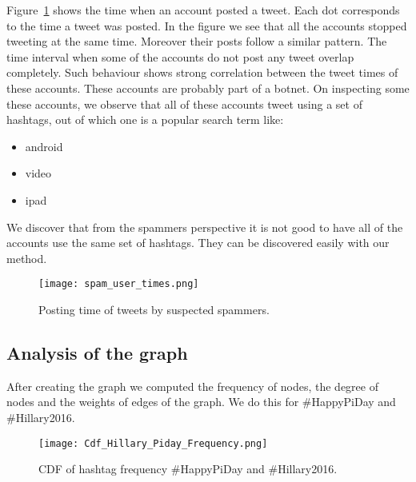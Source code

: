\documentclass[journal, a4paper, 12pt]{article}
\begin{document}
Figure~\ref{fig:spam_user_times} shows the time when an account posted a tweet. Each dot corresponds to the time a tweet was posted. In the figure we see that all the accounts stopped tweeting at the same time. Moreover their posts follow a similar pattern. The time interval when some of the accounts do not post any tweet overlap completely. Such behaviour shows strong correlation between the tweet times of these accounts. These accounts are probably part of a botnet. On inspecting some these accounts, we observe that all of these accounts tweet using a set of hashtags, out of which one is a popular search term like:
\begin{itemize}
\item android
\item video
\item ipad
\end{itemize}

We discover that from the spammers perspective it is not good to have all of the accounts use the same set of hashtags. They can be discovered easily with our method. 

\begin{figure}[!hbt]
            \begin{center}
            \texttt{[image: spam\_user\_times.png]}
            \caption{Posting time of tweets by suspected spammers.}
            \label{fig:spam_user_times}
            \end{center}
      \end{figure}

\subsection{Analysis of the graph}

After creating the graph we computed the frequency of nodes, the degree of nodes and the weights of edges of the graph. We do this for \#HappyPiDay and \#Hillary2016.
\\

        \begin{figure}[!hbt]
            \begin{center}
            \texttt{[image: Cdf\_Hillary\_Piday\_Frequency.png]}
            \caption{CDF of hashtag frequency \#HappyPiDay and \#Hillary2016.}
            \label{fig:cdf_hillary_piday_frequency}
            \end{center}
      \end{figure}
    
\end{document}
